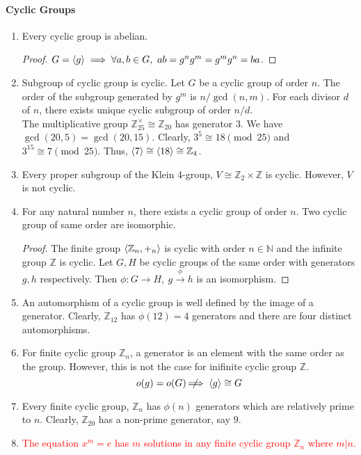 \paragraph{Cyclic Groups}
\begin{enumerate}
	\item Every cyclic group is abelian.
	\begin{proof}
		$G = \left\langle g \right\rangle \implies \forall a,b \in G,\ ab = g^ng^m = g^mg^n = ba$.
	\end{proof}
	\item Subgroup of cyclic group is cyclic. Let $G$ be a cyclic group of order $n$. The order of the subgroup generated by $g^m$ is $n/\gcd(n,m)$. For each divisor $d$ of $n$, there exists unique cyclic subgroup of order $n/d$.\\

	The multiplicative group $\mathbb{Z}_{25}^\times \cong \mathbb{Z}_{20}$ has generator $3$.
	We have $\gcd(20,5) = \gcd(20,15)$.
	Clearly, $3^5 \cong 18 \pmod{25}$ and $3^{15} \cong 7 \pmod{25}$. Thus, $\left\langle 7 \right\rangle \cong \left\langle 18 \right\rangle \cong \mathbb{Z}_4$.
	\item Every proper subgroup of the Klein 4-group, $V \cong \mathbb{Z}_2 \times \mathbb{Z}$ is cyclic. However, $V$ is not cyclic.
	\item For any natural number $n$, there exists a cyclic group of order $n$. Two cyclic group of same order are isomorphic.
	\begin{proof}
		The finite group $\left\langle \mathbb{Z}_n,+_n \right\rangle$ is cyclic with order $n \in \mathbb{N}$ and the infinite group $\mathbb{Z}$ is cyclic.
		Let $G,H$ be cyclic groups of the same order with generators $g,h$ respectively.
		Then $\phi : G \to H,\ g \overset{\phi}{\to} h$ is an isomorphism.
	\end{proof}
	\item An automorphism of a cyclic group is well defined by the image of a generator.
		Clearly, $\mathbb{Z}_{12}$ has $\phi(12)=4$ generators and there are four distinct automorphisms.
	\item For finite cyclic group $\mathbb{Z}_n$, a generator is an element with the same order as the group. However, this is not the case for inifinite cyclic group $\mathbb{Z}$.
		$$o(g) = o(G) \;\not\nobreak\!\!\!\!\implies \left\langle g \right\rangle \cong G$$
	\item Every finite cyclic group, $\mathbb{Z}_n$ has $\phi(n)$ generators which are relatively prime to $n$.
	Clearly, $\mathbb{Z}_{20}$ has a non-prime generator, say $9$.
	\item \textcolor{red}{The equation $x^m = e$ has $m$ solutions in any finite cyclic group $\mathbb{Z}_n$ where $m|n$.}

\end{enumerate}
